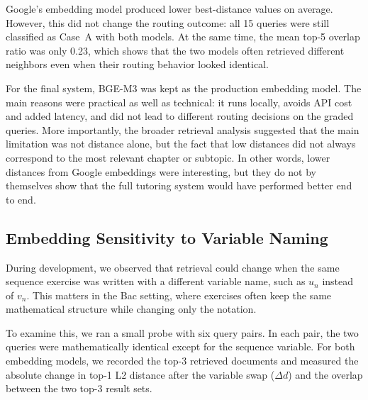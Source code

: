 Google's embedding model produced lower best-distance values on average.
However, this did not change the routing outcome: all 15 queries were still
classified as Case~A with both models. At the same time, the mean top-5
overlap ratio was only 0.23, which shows that the two models often retrieved
different neighbors even when their routing behavior looked identical.

For the final system, BGE-M3 was kept as the production embedding model.
The main reasons were practical as well as technical: it runs locally,
avoids API cost and added latency, and did not lead to different routing
decisions on the graded queries. More importantly, the broader retrieval
analysis suggested that the main limitation was not distance alone, but the
fact that low distances did not always correspond to the most relevant
chapter or subtopic. In other words, lower distances from Google embeddings
were interesting, but they do not by themselves show that the full tutoring
system would have performed better end to end.
\subsection{Embedding Sensitivity to Variable Naming}
\label{subsec:variable-sensitivity}

During development, we observed that retrieval could change when the same
sequence exercise was written with a different variable name, such as $u_n$
instead of $v_n$. This matters in the Bac setting, where exercises often
keep the same mathematical structure while changing only the notation.

To examine this, we ran a small probe with six query pairs. In each pair,
the two queries were mathematically identical except for the sequence
variable. For both embedding models, we recorded the top-3 retrieved
documents and measured the absolute change in top-1 L2 distance after the
variable swap ($\Delta d$) and the overlap between the two top-3 result
sets.

